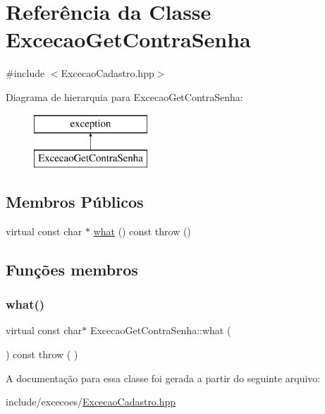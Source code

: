 \hypertarget{class_excecao_get_contra_senha}{}\section{Referência da Classe Excecao\+Get\+Contra\+Senha}
\label{class_excecao_get_contra_senha}


{\ttfamily \#include $<$Excecao\+Cadastro.\+hpp$>$}

Diagrama de hierarquia para Excecao\+Get\+Contra\+Senha\+:\begin{figure}[H]
\begin{center}
\leavevmode
\includegraphics[height=2.000000cm]{class_excecao_get_contra_senha}
\end{center}
\end{figure}
\subsection*{Membros Públicos}
\begin{DoxyCompactItemize}
\item 
virtual const char $\ast$ \mbox{\hyperlink{class_excecao_get_contra_senha_a5199aaf8dbb72b89e99c58ed435ec02d}{what}} () const  throw ()
\end{DoxyCompactItemize}


\subsection{Funções membros}
\mbox{\label{class_excecao_get_contra_senha_a5199aaf8dbb72b89e99c58ed435ec02d}} 
\subsubsection{\texorpdfstring{what()}{what()}}
{\footnotesize\ttfamily virtual const char$\ast$ Excecao\+Get\+Contra\+Senha\+::what (\begin{DoxyParamCaption}{ }\end{DoxyParamCaption}) const throw ( ) \hspace{0.3cm}{\ttfamily [virtual]}}



A documentação para essa classe foi gerada a partir do seguinte arquivo\+:\begin{DoxyCompactItemize}
\item 
include/excecoes/\mbox{\hyperlink{_excecao_cadastro_8hpp}{Excecao\+Cadastro.\+hpp}}\end{DoxyCompactItemize}

